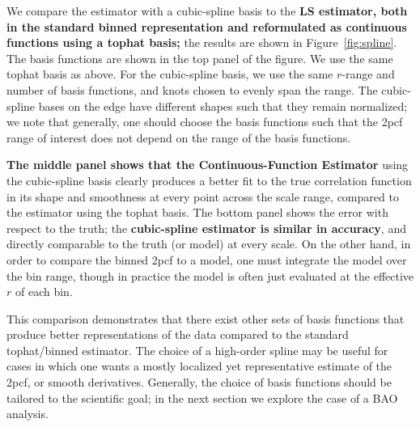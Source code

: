 \documentclass[modern]{aastex62}
\newcommand{\cf}{2pcf\xspace}
\newcommand{\est}{the Continuous-Function Estimator\xspace}
\newcommand{\LS}{LS\xspace}
\newcommand{\new}[1]{\textbf{#1}}
\begin{document}
We compare the estimator with a cubic-spline basis to the \new{\LS estimator, both in the standard binned representation and reformulated as continuous functions using a tophat basis;} the results are shown in Figure~\ref{fig:spline}.
The basis functions are shown in the top panel of the figure.
We use the same tophat basis as above.
For the cubic-spline basis, we use the same $r$-range and number of basis functions, and knots chosen to evenly span the range. 
The cubic-spline bases on the edge have different shapes such that they remain normalized; we note that generally, one should choose the basis functions such that the \cf range of interest does not depend on the range of the basis functions.

\new{The middle panel shows that \est} using the cubic-spline basis clearly produces a better fit to the true correlation function in its shape and smoothness at every point across the scale range, compared to the estimator using the tophat basis.
The bottom panel shows the error with respect to the truth; the \new{cubic-spline estimator is similar in accuracy}, and directly comparable to the truth (or model) at every scale.
On the other hand, in order to compare the binned \cf to a model, one must integrate the model over the bin range, though in practice the model is often just evaluated at the effective $r$ of each bin.

This comparison demonstrates that there exist other sets of basis functions that produce better representations of the data compared to the standard tophat/binned estimator.
The choice of a high-order spline may be useful for cases in which one wants a mostly localized yet representative estimate of the \cf, or smooth derivatives.
Generally, the choice of basis functions should be tailored to the scientific goal; in the next section we explore the case of a BAO analysis.
\end{document}
